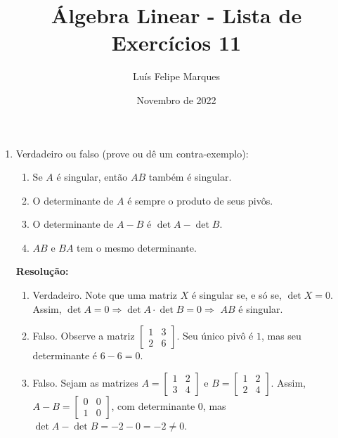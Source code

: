 \documentclass[leqno]{article}
\title{Álgebra Linear - Lista de Exercícios 11}
\author{Luís Felipe Marques}
\date{Novembro de 2022}
\begin{document}
 
\maketitle

\begin{enumerate}
    \item Verdadeiro ou falso (prove ou dê um contra-exemplo):
    
    \begin{enumerate}
        \item Se $A$ é singular, então $AB$ também é singular.
        
        \item O determinante de $A$ é sempre o produto de seus pivôs.
        
        \item O determinante de $A-B$ é $\det A - \det B$.
        
        \item $AB$ e $BA$ tem o mesmo determinante.
    \end{enumerate}
    
    \textbf{Resolução:}

    \begin{enumerate}
        \item Verdadeiro. Note que uma matriz $X$ é singular se, e só se, $\det X=0$. Assim, $\det A=0\Rightarrow \det A\cdot\det B=0\Rightarrow$ $AB$ é singular.
        
        \item Falso. Observe a matriz $\begin{bmatrix}1 & 3\\
        2 & 6\end{bmatrix}$. Seu único pivô é $1$, mas seu determinante é $6-6=0$.
        
        \item Falso. Sejam as matrizes $A=\begin{bmatrix}1 & 2\\
        3 & 4\end{bmatrix}$ e $B=\begin{bmatrix}1 & 2\\
        2 & 4\end{bmatrix}$. Assim, $A-B=\begin{bmatrix}0 & 0\\
        1 & 0\end{bmatrix}$, com determinante $0$, mas $\det A-\det B=-2-0=-2\neq0$.
        

\end{enumerate}
\end{enumerate}
\end{document}
